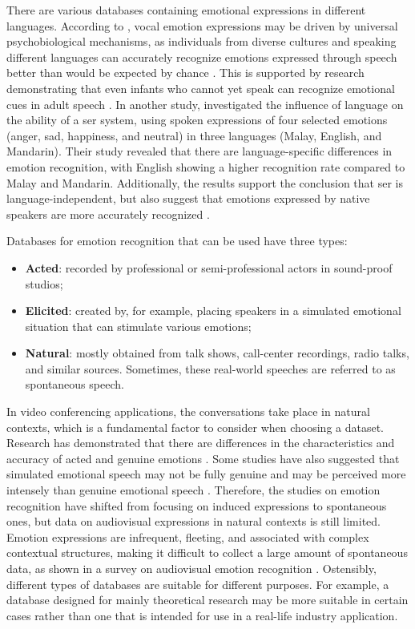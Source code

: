 There are various databases containing emotional expressions in different languages. According to \citeauthor{Scherer2000ACI}, vocal emotion expressions may be driven by universal psychobiological mechanisms, as individuals from diverse cultures and speaking different languages can accurately recognize emotions expressed through speech better than would be expected by chance \cite{Scherer2000ACI}. This is supported by research demonstrating that even infants who cannot yet speak can recognize emotional cues in adult speech \cite{Slaney}. In another study, \citeauthor{Rajoo2016} investigated the influence of language on the ability of a \ac{ser} system, using spoken expressions of four selected emotions (anger, sad, happiness, and neutral) in three languages (Malay, English, and Mandarin). Their study revealed that there are language-specific differences in emotion recognition, with English showing a higher recognition rate compared to Malay and Mandarin. Additionally, the results support the conclusion that \ac{ser} is language-independent, but also suggest that emotions expressed by native speakers are more accurately recognized \cite{Rajoo2016}.

Databases for emotion recognition that can be used have three types:
\begin{itemize}
    \item \textbf{Acted}: recorded by professional or semi-professional actors in sound-proof studios;
    \item \textbf{Elicited}: created by, for example, placing speakers in a simulated emotional situation that can stimulate various emotions;
    \item \textbf{Natural}: mostly obtained from talk shows, call-center recordings, radio talks, and similar sources. Sometimes, these real-world speeches are referred to as spontaneous speech.
\end{itemize}

In video conferencing applications, the conversations take place in natural contexts, which is a fundamental factor to consider when choosing a dataset. Research has demonstrated that there are differences in the characteristics and accuracy of acted and genuine emotions \cite{Vogt}. Some studies have also suggested that simulated emotional speech may not be fully genuine and may be perceived more intensely than genuine emotional speech \cite{2041ade4b5294db59df9f67e9c854632}. Therefore, the studies on emotion recognition have shifted from focusing on induced expressions to spontaneous ones, but data on audiovisual expressions in natural contexts is still limited. Emotion expressions are infrequent, fleeting, and associated with complex contextual structures, making it difficult to collect a large amount of spontaneous data, as shown in a survey on audiovisual emotion recognition \cite{Wu2014}. Ostensibly, different types of databases are suitable for different purposes. For example, a database designed for mainly theoretical research may be more suitable in certain cases rather than one that is intended for use in a real-life industry application.

